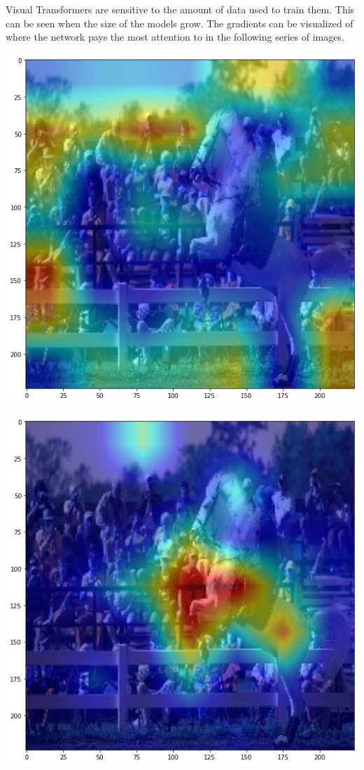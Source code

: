\documentclass[10pt,twocolumn,letterpaper]{article}
\begin{document}
Visual Transformers are sensitive to the amount of data used to train them. This can be seen when the size of the models grow. The gradients can be visualized of where the network pays the most attention to in the following series of images.

\includegraphics[width=0.8\linewidth]{docs/latex/images/brandon/gradcam_tiny_swin.png}

\includegraphics[width=0.8\linewidth]{docs/latex/images/brandon/gradcam_base_swin.png}
\end{document}
